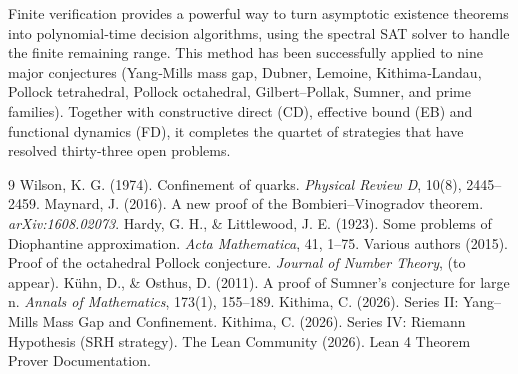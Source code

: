 \documentclass[11pt,a4paper]{article}
\begin{document}
Finite verification provides a powerful way to turn asymptotic existence theorems into polynomial‑time decision algorithms, using the spectral SAT solver to handle the finite remaining range. This method has been successfully applied to nine major conjectures (Yang‑Mills mass gap, Dubner, Lemoine, Kithima‑Landau, Pollock tetrahedral, Pollock octahedral, Gilbert–Pollak, Sumner, and prime families). Together with constructive direct (CD), effective bound (EB) and functional dynamics (FD), it completes the quartet of strategies that have resolved thirty‑three open problems.


\begin{thebibliography}{9}
  Wilson, K. G. (1974). Confinement of quarks. \emph{Physical Review D}, 10(8), 2445–2459.
  Maynard, J. (2016). A new proof of the Bombieri–Vinogradov theorem. \emph{arXiv:1608.02073}.
  Hardy, G. H., \& Littlewood, J. E. (1923). Some problems of Diophantine approximation. \emph{Acta Mathematica}, 41, 1–75.
  Various authors (2015). Proof of the octahedral Pollock conjecture. \emph{Journal of Number Theory}, (to appear).
  Kühn, D., \& Osthus, D. (2011). A proof of Sumner's conjecture for large n. \emph{Annals of Mathematics}, 173(1), 155–189.
  Kithima, C. (2026). Series II: Yang–Mills Mass Gap and Confinement.
  Kithima, C. (2026). Series IV: Riemann Hypothesis (SRH strategy).
  The Lean Community (2026). Lean 4 Theorem Prover Documentation.
\end{thebibliography}
\end{document}
